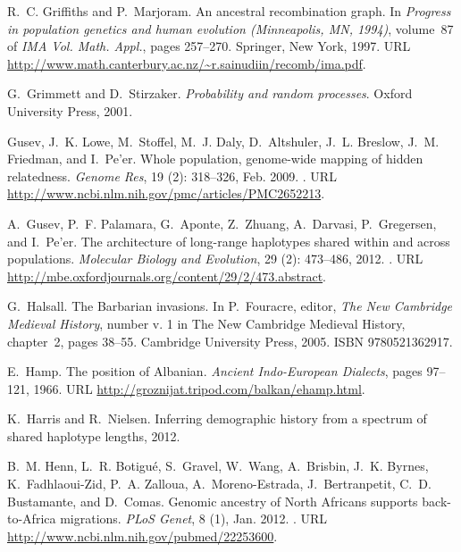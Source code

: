 \documentclass{article}
\begin{document}
\begin{thebibliography}{76}
R.~C. Griffiths and P.~Marjoram.
\newblock An ancestral recombination graph.
\newblock In \emph{Progress in population genetics and human evolution
  ({M}inneapolis, {MN}, 1994)}, volume~87 of \emph{IMA Vol. Math. Appl.}, pages
  257--270. Springer, New York, 1997.
\newblock URL
  \url{http://www.math.canterbury.ac.nz/~r.sainudiin/recomb/ima.pdf}.

G.~Grimmett and D.~Stirzaker.
\newblock \emph{Probability and random processes}.
\newblock Oxford University Press, 2001.

Gusev, J.~K. Lowe, M.~Stoffel, M.~J. Daly, D.~Altshuler, J.~L. Breslow, J.~M.
  Friedman, and I.~Pe'er.
\newblock Whole population, genome-wide mapping of hidden relatedness.
\newblock \emph{Genome Res}, 19 (2): 318--326, Feb. 2009.
\newblock {}.
\newblock URL \url{http://www.ncbi.nlm.nih.gov/pmc/articles/PMC2652213}.

A.~Gusev, P.~F. Palamara, G.~Aponte, Z.~Zhuang, A.~Darvasi, P.~Gregersen, and
  I.~Pe'er.
\newblock The architecture of long-range haplotypes shared within and across
  populations.
\newblock \emph{Molecular Biology and Evolution}, 29 (2):
  473--486, 2012.
\newblock {}.
\newblock URL \url{http://mbe.oxfordjournals.org/content/29/2/473.abstract}.

G.~Halsall.
\newblock The {Barbarian} invasions.
\newblock In P.~Fouracre, editor, \emph{The New Cambridge Medieval History},
  number v. 1 in The New Cambridge Medieval History, chapter~2, pages 38--55.
  Cambridge University Press, 2005.
\newblock ISBN 9780521362917.

E.~Hamp.
\newblock The position of {Albanian}.
\newblock \emph{Ancient Indo-European Dialects}, pages 97--121, 1966.
\newblock URL \url{http://groznijat.tripod.com/balkan/ehamp.html}.

K.~Harris and R.~Nielsen.
\newblock Inferring demographic history from a spectrum of shared haplotype
  lengths, 2012.

B.~M. Henn, L.~R. Botigu{\'e}, S.~Gravel, W.~Wang, A.~Brisbin, J.~K. Byrnes,
  K.~Fadhlaoui-Zid, P.~A. Zalloua, A.~Moreno-Estrada, J.~Bertranpetit, C.~D.
  Bustamante, and D.~Comas.
\newblock Genomic ancestry of {North} {Africans} supports back-to-{Africa}
  migrations.
\newblock \emph{PLoS Genet}, 8 (1), Jan. 2012{}.
\newblock {}.
\newblock URL \url{http://www.ncbi.nlm.nih.gov/pubmed/22253600}.


\end{thebibliography}
\end{document}
